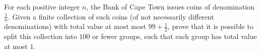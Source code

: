 For each positive integer 
$n$, 
 the Bank of Cape Town issues coins of denomination 
 $\frac{1}{n}$.
 Given a finite collection of such coins (of not necessarily different denominations) with total value at most most 
$99+\frac12$, 
 prove that it is possible to split this collection into 
$100$
 or fewer groups, such that each group has total value at most 
$1$.
